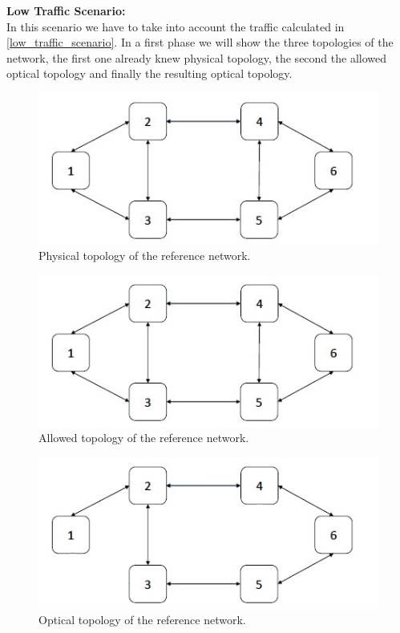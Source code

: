 \textbf{Low Traffic Scenario:}\\

In this scenario we have to take into account the traffic calculated in \ref{low_traffic_scenario}. In a first phase we will show the three topologies of the network, the first one already knew physical topology, the second the allowed optical topology and finally the resulting optical topology.\\

\begin{figure}[h!]
\centering
\includegraphics[width=13cm]{sdf/ilp/opaque_survivability/figures/physical_opaque_surv_ref_low}
\caption{Physical topology of the reference network.}
\label{physical_surv_ref_low}
\end{figure}

\begin{figure}[h!]
\centering
\includegraphics[width=13cm]{sdf/ilp/opaque_survivability/figures/allowed_opaque_surv_ref_low}
\caption{Allowed topology of the reference network.}
\label{allowed_surv_ref_low}
\end{figure}

\begin{figure}[h!]
\centering
\includegraphics[width=14cm]{sdf/ilp/opaque_survivability/figures/optical_opaque_surv_ref_low}
\caption{Optical topology of the reference network.}
\label{optical_surv_ref_low}
\end{figure}


